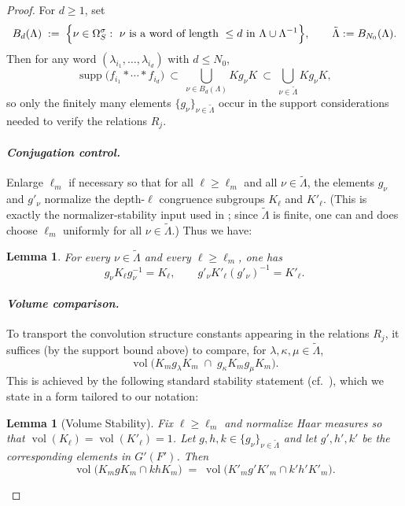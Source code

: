 \documentclass[american]{article}
\numberwithin{equation}{section}
\numberwithin{figure}{section}
\theoremstyle{plain}
\newtheorem{lemma}[theorem]{Lemma}
\theoremstyle{definition}
\theoremstyle{remark}
\DeclareMathOperator{\vol}{vol}
\begin{document}
\begin{proof}
For \(d\ge 1\), set
\[
  B_d(\Lambda)\;:=\;\Bigl\{\nu\in\Omega_S^{\sigma}:\ \nu
  \text{ is a word of length }\le d\text{ in }\Lambda\cup\Lambda^{-1}\Bigr\},
\qquad
\tilde{\Lambda}:=B_{N_0}(\Lambda).
\]
Then for any word \((\lambda_{i_1},\dots,\lambda_{i_d})\) with \(d\le N_0\),
\[
\operatorname{supp}\bigl(f_{i_1}*\cdots * f_{i_d}\bigr)
\ \subset\
\bigcup_{\nu\in B_d(\Lambda)} K g_\nu K
\ \subset\
\bigcup_{\nu\in \tilde{\Lambda}} K g_\nu K,
\]
so only the finitely many elements \(\{g_\nu\}_{\nu\in\tilde\Lambda}\) occur in the support
considerations needed to verify the relations \(R_j\).

\paragraph{\textit{Conjugation control.}}
Enlarge \(\ell_m\) if necessary so that for all \(\ell\ge \ell_m\) and all \(\nu\in\tilde\Lambda\),
the elements \(g_\nu\) and \(g'_\nu\) normalize the depth-\(\ell\) congruence subgroups \(K_\ell\) and \(K'_\ell\).
(This is exactly the normalizer-stability input used in \cite[\S4]{ganapathy2022}; since \(\tilde\Lambda\) is finite,
one can and does choose \(\ell_m\) uniformly for all \(\nu\in\tilde\Lambda\).)
Thus we have:

\begin{lemma}\label{lem:conj}
For every \(\nu\in\tilde{\Lambda}\) and every \(\ell\ge \ell_m\), one has
\[
g_\nu K_\ell g_\nu^{-1}=K_\ell,
\qquad
g'_\nu K'_\ell (g'_\nu)^{-1}=K'_\ell.
\]
\end{lemma}

\paragraph{\textit{Volume comparison.}}
To transport the convolution structure constants appearing in the relations \(R_j\), it suffices (by the
support bound above) to compare, for \(\lambda,\kappa,\mu\in\tilde{\Lambda}\),
\[
   \vol\!\bigl(K_m g_\lambda K_m \;\cap\; g_\kappa K_m g_\mu K_m\bigr).
\]
This is achieved by the following standard stability statement (cf.\ \cite[Lem.~4.6 and the argument on p.~321]{ganapathy2022}),
which we state in a form tailored to our notation:

\begin{lemma}[Volume Stability]\label{lem:volume}
Fix \(\ell\ge \ell_m\) and normalize Haar measures so that \(\vol(K_\ell)=\vol(K'_\ell)=1\).
Let \(g,h,k\in\{g_\nu\}_{\nu\in\tilde\Lambda}\) and let \(g',h',k'\) be the corresponding elements in \(G'(F')\).
Then
\[
   \vol\!\bigl(K_m g K_m \cap k h K_m\bigr)
   \;=\;
   \vol\!\bigl(K'_m g' K'_m \cap k' h' K'_m\bigr).
\]
\end{lemma}


\end{proof}
\end{document}
